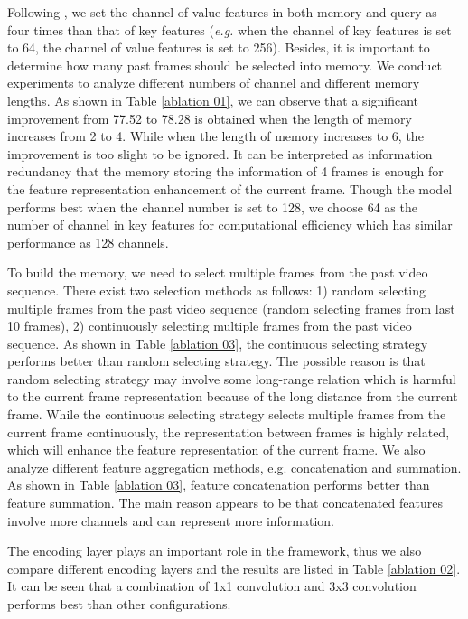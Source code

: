 \documentclass{article}
\begin{document}
	Following \cite{STA2019}, we set the channel of value features in both memory and query as four times than that of key features (\emph{e.g.} when the channel of key features is set to 64, the channel of value features is set to 256). Besides, it is important to determine how many past frames should be selected into memory. 
	We conduct experiments to analyze different numbers of channel and different memory lengths. As shown in Table \ref{ablation 01}, we can observe that a significant improvement from 77.52 to 78.28 is obtained when the length of memory increases from 2 to 4. While when the length of memory increases to 6, the improvement is too slight to be ignored. 
	It can be interpreted as information redundancy that the memory storing the information of 4 frames is enough for the feature representation enhancement of the current frame.
	Though the model performs best when the channel number is set to 128, we choose 64 as the number of channel in key features for computational efficiency which has similar performance as 128 channels.  
	
	To build the memory, we need to select multiple frames from the past video sequence.
	There exist two selection methods as follows: 1) random selecting multiple frames from the past video sequence (random selecting  frames from last 10 frames), 2) continuously selecting multiple frames from the past video sequence. 
	As shown in Table \ref{ablation 03},  the continuous selecting strategy performs better than random selecting strategy. The possible reason is that random selecting strategy may involve some long-range relation which is harmful to the current frame representation because of the long distance from the current frame. While the continuous selecting strategy selects multiple frames from the current frame continuously, the representation between frames is highly related, which will enhance the feature representation of the current frame. We also analyze different feature aggregation methods, e.g. concatenation and summation. As shown in Table \ref{ablation 03}, feature concatenation performs better than feature summation. The main reason appears to be that concatenated features involve more channels and can represent more information. 
	
The encoding layer plays an important role in the framework, thus we also compare different encoding layers and the results are listed in Table \ref{ablation 02}. It can be seen that a combination of  1x1 convolution and  3x3 convolution performs best than other configurations. 
	
\end{document}
